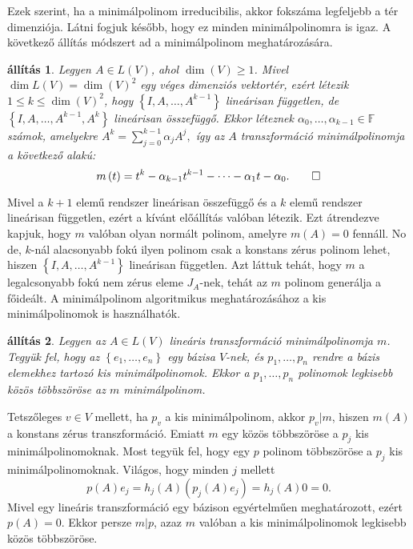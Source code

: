 \documentclass[9pt, a4paper, showtrims]{memoir}
\makeatletter
\renewenvironment{proof}[1][\proofname]
    {\par\pushQED{\qed}%
    \normalfont \topsep6\p@\@plus6\p@\relax
    \trivlist
    \item[\hskip\labelsep
        \itshape
    #1\@addpunct{:}]\ignorespaces}
    {\popQED\endtrivlist\@endpefalse}
\theoremstyle{plain}
\newtheorem{proposition}{állítás}[chapter]
\theoremstyle{remark}
\theoremstyle{definition}
\makeatother
\begin{document}
Ezek szerint, ha a minimálpolinom irreducibilis, akkor fokszáma legfeljebb a tér dimenziója. 
Látni fogjuk később, hogy ez minden minimálpolinomra is igaz.
A következő állítás módszert ad a minimálpolinom meghatározására.
\begin{proposition}
	Legyen $A\in L\left( V \right)$, ahol $\dim(V)\geq 1$.
	Mivel $\dim L\left( V \right)=\dim(V)^2$ egy véges dimenziós vektortér,
	ezért létezik $1\leq k \leq \dim(V)^2$,
	hogy
	$\left\{ I,A,\ldots,A^{k-1} \right\}$ lineárisan független,
	de $\left\{ I,A,\ldots,A^{k-1},A^{k} \right\}$ lineárisan összefüggő.
	Ekkor léteznek $\alpha_0,\ldots,\alpha_{k-1}\in\mathbb{F}$
	számok, amelyekre
	\(
		A^{k}=\sum_{j=0}^{k-1}\alpha_jA^{j},
	\)
	így az $A$ transzformáció minimálpolinomja a következő alakú:
	\[
		m\left( t \right)=
		t^k-\alpha_{k-1}t^{k-1}-\dots-\alpha_1t-\alpha_0.\qedhere
	\]
\end{proposition}
\begin{proof}
	Mivel a $k+1$ elemű rendszer lineárisan összefüggő és a $k$ elemű rendszer lineárisan független,
	ezért a kívánt előállítás valóban létezik.
	Ezt átrendezve kapjuk, hogy $m$ valóban olyan normált polinom, amelyre $m\left( A \right)=0$ fennáll.
	No de, $k$-nál alacsonyabb fokú ilyen polinom csak a konstans zérus polinom lehet,
	hiszen $\left\{ I,A,\ldots,A^{k-1} \right\}$ lineárisan független.
	Azt láttuk tehát, hogy $m$ a legalcsonyabb fokú nem zérus eleme $J_{A}$-nek,
	tehát az $m$ polinom generálja a főideált.
\end{proof}
A minimálpolinom algoritmikus meghatározásához a kis minimálpolinomok is használhatók.
\begin{proposition}
    \label{pr:lkkt-minimalpolinom}
	Legyen az $A\in L\left( V \right)$ lineáris transzformáció minimálpolinomja $m$.
	Tegyük fel, hogy az $\left\{ e_1,\ldots,e_n \right\}$ egy bázisa $V$-nek,
	és $p_1,\ldots,p_n$ rendre a bázis elemekhez tartozó kis minimálpolinomok.
	Ekkor a $p_1,\ldots,p_n$ polinomok legkisebb közös többszöröse az $m$ minimálpolinom.
\end{proposition}
\begin{proof}
	Tetszőleges $v\in V$ mellett, ha $p_v$ a kis minimálpolinom,
	akkor $p_v|m$, hiszen $m\left( A \right)$ a konstans zérus transzformáció.
	Emiatt $m$ egy közös többszöröse a $p_j$ kis minimálpolinomoknak.
	Most tegyük fel, hogy egy $p$ polinom többszöröse a $p_j$ kis minimálpolinomoknak.
	Világos, hogy minden $j$ mellett
	\[
		p\left( A \right)e_j
		=
		h_j\left( A \right)\left( p_j\left( A \right)e_j \right)
		=
		h_j\left( A \right)0
		=
		0.
	\]
	Mivel egy lineáris transzformáció egy bázison egyértelműen meghatározott, ezért
	$p\left( A \right)=0$.
	Ekkor persze $m|p$,
	azaz $m$ valóban  a kis minimálpolinomok legkisebb közös többszöröse.
\end{proof}
\end{document}

